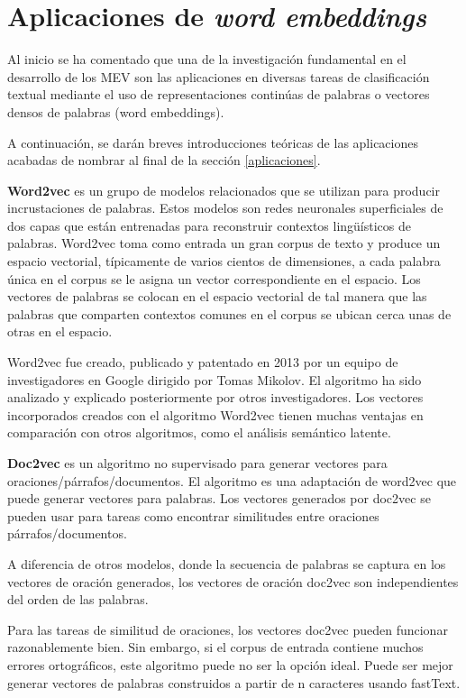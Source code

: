 \documentclass[titlepage]{article}
\begin{document}
\section{Aplicaciones de \textit{word embeddings}}

Al inicio se ha comentado que una de la investigación fundamental en el desarrollo de los MEV son las aplicaciones en diversas tareas de clasificación textual mediante el uso de representaciones continúas de palabras o vectores densos de palabras (word embeddings). 

A continuación, se darán breves introducciones teóricas de las aplicaciones acabadas de nombrar al final de la sección \ref{aplicaciones}.

\textbf{Word2vec} es un grupo de modelos relacionados que se utilizan para producir incrustaciones de palabras. Estos modelos son redes neuronales superficiales de dos capas que están entrenadas para reconstruir contextos lingüísticos de palabras. Word2vec toma como entrada un gran corpus de texto y produce un espacio vectorial, típicamente de varios cientos de dimensiones, a cada palabra única en el corpus se le asigna un vector correspondiente en el espacio. Los vectores de palabras se colocan en el espacio vectorial de tal manera que las palabras que comparten contextos comunes en el corpus se ubican cerca unas de otras en el espacio. 

Word2vec fue creado, publicado y patentado en 2013 por un equipo de investigadores en Google dirigido por Tomas Mikolov. El algoritmo ha sido analizado y explicado posteriormente por otros investigadores. Los vectores incorporados creados con el algoritmo Word2vec tienen muchas ventajas en comparación con otros algoritmos, como el análisis semántico latente.

\textbf{Doc2vec} es un algoritmo no supervisado para generar vectores para oraciones/párrafos/documentos. El algoritmo es una adaptación de word2vec que puede generar vectores para palabras. Los vectores generados por doc2vec se pueden usar para tareas como encontrar similitudes entre oraciones párrafos/documentos.

A diferencia de otros modelos, donde la secuencia de palabras se captura en los vectores de oración generados, los vectores de oración doc2vec son independientes del orden de las palabras.

Para las tareas de similitud de oraciones, los vectores doc2vec pueden funcionar razonablemente bien. Sin embargo, si el corpus de entrada contiene muchos errores ortográficos, este algoritmo puede no ser la opción ideal. Puede ser mejor generar vectores de palabras construidos a partir de n caracteres usando fastText. 
\end{document}
